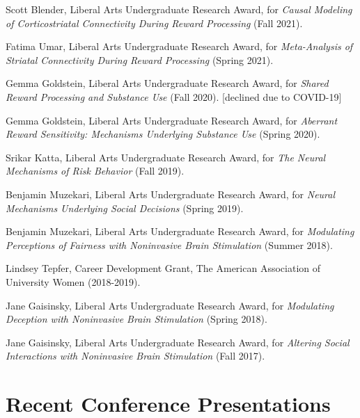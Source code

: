 \documentclass[11pt, letterpaper]{article}
\begin{document}
\begin{hangparas}{.5in}{1}

Scott Blender, Liberal Arts Undergraduate Research Award, for \textit{Causal Modeling of Corticostriatal Connectivity During Reward Processing} (Fall 2021).

Fatima Umar, Liberal Arts Undergraduate Research Award, for \textit{Meta-Analysis of Striatal Connectivity During Reward Processing} (Spring 2021).

Gemma Goldstein, Liberal Arts Undergraduate Research Award, for \textit{Shared Reward Processing and Substance Use} (Fall 2020). [declined due to COVID-19]

Gemma Goldstein, Liberal Arts Undergraduate Research Award, for \textit{Aberrant Reward Sensitivity: Mechanisms Underlying Substance Use} (Spring 2020). 

Srikar Katta, Liberal Arts Undergraduate Research Award, for \textit{The Neural Mechanisms of Risk Behavior} (Fall 2019).

Benjamin Muzekari, Liberal Arts Undergraduate Research Award, for \textit{Neural Mechanisms Underlying Social Decisions} (Spring 2019).

Benjamin Muzekari, Liberal Arts Undergraduate Research Award, for \textit{Modulating Perceptions of Fairness with Noninvasive Brain Stimulation} (Summer 2018).

Lindsey Tepfer, Career Development Grant, The American Association of University Women (2018-2019).

Jane Gaisinsky, Liberal Arts Undergraduate Research Award, for \textit{Modulating Deception with Noninvasive Brain Stimulation} (Spring 2018).

Jane Gaisinsky, Liberal Arts Undergraduate Research Award, for \textit{Altering Social Interactions with Noninvasive Brain Stimulation} (Fall 2017). \\

\end{hangparas}



\vspace{.2cm}

\section*{Recent Conference Presentations}
\label{sec:conferences}
\end{document}
